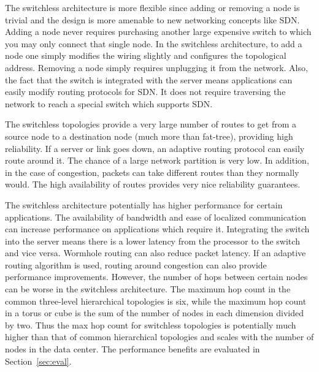 The switchless architecture is more flexible since adding or removing a node is trivial and the design is more amenable to new networking concepts like SDN.  Adding a node never requires purchasing another large expensive switch to which you may only connect that single node.  In the switchless architecture, to add a node one simply modifies the wiring slightly and configures the topological address.  Removing a node simply requires unplugging it from the network.  Also, the fact that the switch is integrated with the server means applications can easily modify routing protocols for SDN.  It does not require traversing the network to reach a special switch which supports SDN.

The switchless topologies provide a very large number of routes to get from a source node to a destination node (much more than fat-tree), providing high reliability.  If a server or link goes down, an adaptive routing protocol can easily route around it.  The chance of a large network partition is very low.  In addition, in the case of congestion, packets can take different routes than they normally would.  The high availability of routes provides very nice reliability guarantees.

The switchless architecture potentially has higher performance for certain applications.  The availability of bandwidth and ease of localized communication can increase performance on applications which require it.  Integrating the switch into the server means there is a lower latency from the processor to the switch and vice versa.  Wormhole routing can also reduce packet latency.  If an adaptive routing algorithm is used, routing around congestion can also provide performance improvements.  However, the number of hops between certain nodes can be worse in the switchless architecture.  The maximum hop count in the common three-level hierarchical topologies is six, while the maximum hop count in a torus or cube is the sum of the number of nodes in each dimension divided by two.  Thus the max hop count for switchless topologies is potentially much higher than that of common hierarchical topologies and scales with the number of nodes in the data center.  The performance benefits are evaluated in Section~\ref{sec:eval}.
